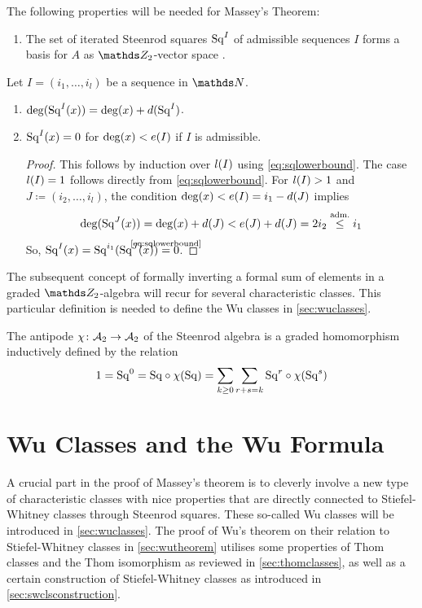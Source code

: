 \begin{Rem}\label{rem:sq}
  The following properties will be needed for Massey's Theorem:
  \begin{enumerate}
  \item The set of iterated Steenrod squares $\mathrm{Sq}^{I}$ of admissible
    sequences $I$ forms a basis for $A$ as $\Zmod2$-vector space
    \cite[Chap.~6, Theorem~1]{mosher}.
  \end{enumerate}
  Let $I=(i_1,\dotsc,i_l)$ be a sequence in $\Nat$.
  \begin{enumerate}[resume]
  \item $\deg(\mathrm{Sq}^{I}(x)) = \deg(x) + d(\mathrm{Sq}^{I})$.
  \item\label{item:squpperboundgeneral} $\mathrm{Sq}^{I}(x) = 0$ for  $\deg(x)<e(I)$ if $I$ is admissible.
    \begin{proof}
      This follows by induction over $l(I)$ using
      \eqref{eq:sqlowerbound}. The case $l(I)=1$ follows directly 
      from \eqref{eq:sqlowerbound}.
      For $l(I)>1$ and $J\coloneqq(i_2,\dotsc,i_l)$, the condition
      $\deg(x) < e(I)=i_1-d(J)$
      implies
      \begin{gather*}
        \deg(\mathrm{Sq}^{J}(x))
        = \deg(x)+d(J) < e(J)+d(J) = 2i_2
        \overset{\text{adm.}}\leq i_1
      \end{gather*}
      So,
      $\Sq I(x)=\Sq{i_1}(\Sq J(x)) \cequalsby{\eqref{eq:sqlowerbound}} 0$.
    \end{proof}
  \end{enumerate}
\end{Rem}

The subsequent concept of formally inverting a formal sum of elements
in a graded $\Zmod2$-algebra will recur for several characteristic
classes. This particular definition is needed to define the Wu classes
in \autoref{sec:wuclasses}. 
\begin{Def}\label{def:antipode}
  The antipode $\chi\colon \mathcal{A}_2\to\mathcal{A}_2$ of the Steenrod algebra is a
  graded homomorphism inductively defined by the relation
  \begin{gather*}
    1 = \mathrm{Sq}^{0}
    = \mathrm{Sq} \circ \chi(\mathrm{Sq})
    = \sum_{k\geq0}\sum_{r+s=k} \mathrm{Sq}^{r} \circ \chi(\mathrm{Sq}^{s})
  \end{gather*}
\end{Def}

\section{Wu Classes and the Wu Formula}\label{sec:wuclassesmain}
A crucial part in the proof of Massey's theorem is to cleverly involve
a new type of characteristic classes with nice properties that are
directly connected to Stiefel-Whitney classes through Steenrod
squares.
These so-called Wu classes will be introduced in
\autoref{sec:wuclasses}.
The proof of Wu's theorem on their relation to Stiefel-Whitney
classes in \autoref{sec:wutheorem} utilises some properties of Thom
classes and the Thom isomorphism as reviewed in
\autoref{sec:thomclasses}, as well as a certain construction of
Stiefel-Whitney classes as introduced in
\autoref{sec:swclsconstruction}.


